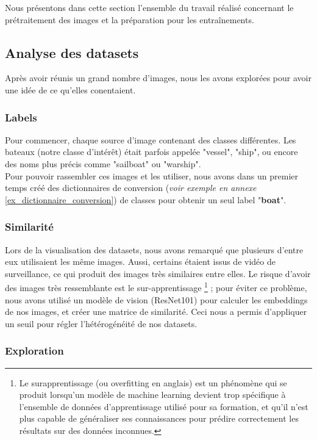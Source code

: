 Nous présentons dans cette section l'ensemble du travail réalisé concernant le prétraitement des images
et la préparation pour les entraînements. 

\subsection{Analyse des datasets}

Après avoir réunis un grand nombre d'images, nous les avons explorées pour avoir une idée de ce qu'elles 
conentaient. 

\subsubsection{Labels}

Pour commencer, chaque source d'image contenant des classes différentes. Les bateaux 
(notre classe d'intérêt) était parfois appelée "vessel", "ship", ou encore des noms plus précis
comme "sailboat" ou "warship".\\

Pour pouvoir rassembler ces images et les utiliser, nous avons dans un premier temps 
créé des dictionnaires de conversion (\textit{voir exemple en annexe }\ref{ex_dictionnaire_conversion}) de classes pour obtenir un seul label "\textbf{boat}". 

\subsubsection{Similarité}
\label{similarite}

Lors de la visualisation des datasets, nous avons remarqué que plusieurs d'entre eux utilisaient les 
même images. Aussi, certains étaient issus de vidéo de surveillance, ce qui produit des images 
très similaires entre elles. Le risque d'avoir des images très ressemblante est le sur-apprentissage
\footnote{Le surapprentissage (ou overfitting en anglais) est un phénomène qui se produit 
lorsqu'un modèle de machine learning devient trop spécifique à l'ensemble de données d'apprentissage 
utilisé pour sa formation, et qu'il n'est plus capable de généraliser ses connaissances 
pour prédire correctement les résultats sur des données inconnues.} ; pour éviter ce problème, 
nous avons utilisé un modèle de vision (ResNet101) pour calculer les embeddings de nos images, 
et créer une matrice de similarité. Ceci nous a permis d'appliquer un seuil pour régler l'hétérogénéité 
de nos datasets. 

\subsubsection{Exploration}

